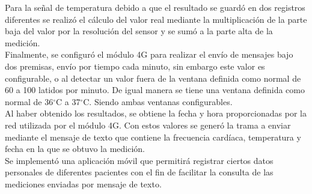 Para la señal de temperatura debido a que el resultado se guardó en dos registros diferentes se realizó el cálculo del valor real mediante la multiplicación de la parte baja del valor por la resolución del sensor y se sumó a la parte alta de la medición.\\

Finalmente, se configuró el módulo 4G para realizar el envío de mensajes bajo dos premisas, envío por tiempo cada minuto, sin embargo este valor es configurable, o al detectar un valor fuera de la ventana definida como normal de 60 a 100 latidos por minuto. De igual manera se tiene una ventana definida como normal de 36$^{\circ}$C a 37$^{\circ}$C. Siendo ambas ventanas configurables. \\ 

Al haber obtenido los resultados, se obtiene la fecha y hora proporcionadas por la red utilizada por el módulo 4G. Con estos valores se generó la trama a enviar mediante el mensaje de texto que contiene la frecuencia cardíaca, temperatura y fecha en la que se obtuvo la medición. \\

Se implementó una aplicación móvil que permitirá registrar ciertos datos personales de diferentes pacientes con el fin de facilitar la consulta de las mediciones enviadas por mensaje de texto.

